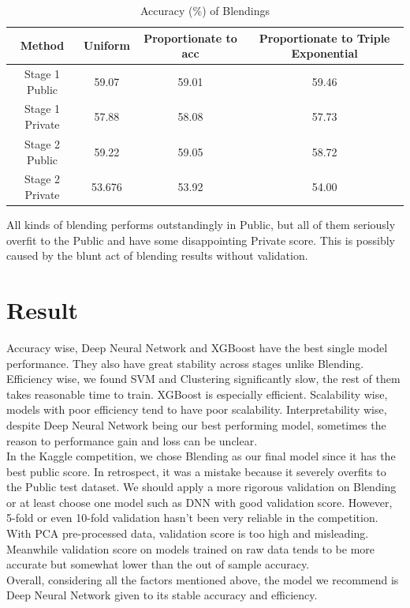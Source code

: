 \documentclass[11pt,a4paper]{article}
\begin{document}
\begin{table}[H]
  \centering
  \begin{tabular}{|c|c|c|c|}
  \hline
  Method & Uniform & Proportionate to acc & Proportionate to Triple Exponential \\ \hline
  Stage 1 Public & 59.07 & 59.01 & 59.46 \\ \hline
  Stage 1 Private & 57.88 & 58.08 & 57.73 \\ \hline
  Stage 2 Public & 59.22 & 59.05 & 58.72 \\ \hline
  Stage 2 Private & 53.676 & 53.92 & 54.00 \\ \hline
  \end{tabular}
  \caption{Accuracy (\%) of Blendings}
  \label{tab:blending-acc}
\end{table}

All kinds of blending performs outstandingly in Public, but all of them seriously overfit to the Public and have some disappointing Private score. 
This is possibly caused by the blunt act of blending results without validation.

\section{Result}
Accuracy wise, Deep Neural Network and XGBoost have the best single model performance. They also have great stability across stages unlike Blending. 
Efficiency wise, we found SVM and Clustering significantly slow, the rest of them takes reasonable time to train. XGBoost is especially efficient. 
Scalability wise, models with poor efficiency tend to have poor scalability. 
Interpretability wise, despite Deep Neural Network being our best performing model, sometimes the reason to performance gain and loss can be unclear. \\
In the Kaggle competition, we chose Blending as our final model since it has the best public score. In retrospect, it was a mistake because it severely overfits to the Public test dataset. 
We should apply a more rigorous validation on Blending or at least choose one model such as DNN with good validation score. 
However, 5-fold or even 10-fold validation hasn't been very reliable in the competition. With PCA pre-processed data, validation score is too high and misleading. Meanwhile validation score on models trained on raw data tends to be more accurate but somewhat lower than the out of sample accuracy. \\
Overall, considering all the factors mentioned above, the model we recommend is Deep Neural Network given to its stable accuracy and efficiency. 
\end{document}
